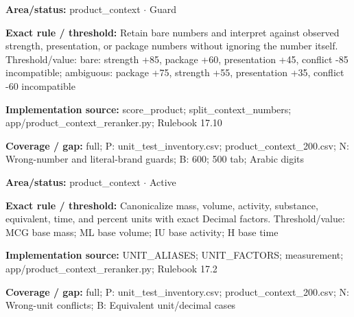 \begin{tcolorbox}[enhanced,breakable,colback=white,colframe=Muted!45,boxrule=0.45pt,arc=1.5pt,left=6pt,right=6pt,top=5pt,bottom=5pt,title={\texttt{PC-UNITLESS-SCORE-12}},title after break={\texttt{PC-UNITLESS-SCORE-12}\ (continued)},fonttitle=\headingfont\bfseries\color{Navy},coltitle=Navy]
\textbf{Area/status:} product\_\allowbreak{}context $\boldsymbol{\cdot}$ Guard\par
\smallskip
\textbf{Exact rule / threshold:} Retain bare numbers and interpret against observed strength, presentation, or package numbers without ignoring the number itself. Threshold/\allowbreak{}value: bare: strength +85, package +60, presentation +45, conflict -85 incompatible; ambiguous: package +75, strength +55, presentation +35, conflict -60 incompatible\par
\smallskip
\textbf{Implementation source:} score\_\allowbreak{}product; split\_\allowbreak{}context\_\allowbreak{}numbers; app/\allowbreak{}product\_\allowbreak{}context\_\allowbreak{}reranker.py; Rulebook 17.10\par
\smallskip
\textbf{Coverage / gap:} full; P: unit\_\allowbreak{}test\_\allowbreak{}inventory.csv; product\_\allowbreak{}context\_\allowbreak{}200.csv; N: Wrong-number and literal-brand guards; B: 600; 500 tab; Arabic digits
\end{tcolorbox}
\begin{tcolorbox}[enhanced,breakable,colback=white,colframe=Muted!45,boxrule=0.45pt,arc=1.5pt,left=6pt,right=6pt,top=5pt,bottom=5pt,title={\texttt{PC-UNITS-02}},title after break={\texttt{PC-UNITS-02}\ (continued)},fonttitle=\headingfont\bfseries\color{Navy},coltitle=Navy]
\textbf{Area/status:} product\_\allowbreak{}context $\boldsymbol{\cdot}$ Active\par
\smallskip
\textbf{Exact rule / threshold:} Canonicalize mass, volume, activity, substance, equivalent, time, and percent units with exact Decimal factors. Threshold/\allowbreak{}value: MCG base mass; ML base volume; IU base activity; H base time\par
\smallskip
\textbf{Implementation source:} UNIT\_\allowbreak{}ALIASES; UNIT\_\allowbreak{}FACTORS; measurement; app/\allowbreak{}product\_\allowbreak{}context\_\allowbreak{}reranker.py; Rulebook 17.2\par
\smallskip
\textbf{Coverage / gap:} full; P: unit\_\allowbreak{}test\_\allowbreak{}inventory.csv; product\_\allowbreak{}context\_\allowbreak{}200.csv; N: Wrong-unit conflicts; B: Equivalent unit/\allowbreak{}decimal cases
\end{tcolorbox}
\medskip
